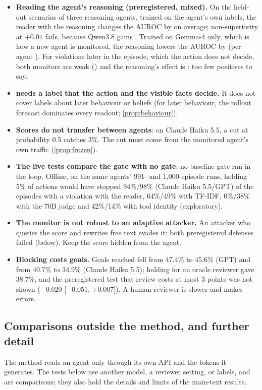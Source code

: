 \begin{itemize}
\item \textbf{Reading the agent's reasoning (preregistered, mixed).} On the held-out scenarios of three reasoning agents, trained on the agent's own labels, the reader with the reasoning changes the AUROC by \GEightInagent{} on average; non-superiority at $+0.01$ fails, because Qwen3.8 gains \GEightQwen{}. Trained on Gemma-4 only, which is how a new agent is monitored, the reasoning lowers the AUROC by \GEightTransfer{} (per agent \GEightTransferEach{}). For violations later in the episode, which the action does not decide, both monitors are weak (\GEightFutureLevel{}) and the reasoning's effect is \GEightFuture{}: too few positives to say.
\item \textbf{ needs a label that the action and the visible facts decide.} It does not cover labels about
  later behaviour or beliefs (for later behaviour, the rollout forecast dominates every readout; \cref{prop:behaviour}).
\item \textbf{Scores do not transfer between agents}: on Claude Haiku 5.5, a cut at probability 0.5 catches 3\%. The cut must come
  from the monitored agent's own traffic (\cref{prop:frozen}).
\item \textbf{The live tests compare the gate with no gate}; no baseline gate ran in the loop. Offline, on the same agents'
  991- and 1{,}000-episode runs, holding 5\% of actions would have stopped 94\%/98\% (Claude Haiku 5.5/GPT) of the episodes with a violation
  with the reader, 64\%/49\% with TF-IDF, 0\%/38\% with the 70B judge and 42\%/14\% with tool identity (exploratory).
\item \textbf{The monitor is not robust to an adaptive attacker.} An attacker who queries the score and rewrites free text evades it; both preregistered defenses failed (below). Keep the score hidden from the agent.
\item \textbf{Blocking costs goals.} Goals reached fell from 47.4\% to 45.6\% (GPT) and from 40.7\% to 34.9\% (Claude Haiku 5.5); holding
  for an oracle reviewer gave 38.7\%, and the preregistered test that review costs at most 3 points was not shown
  ($-0.020$ [$-0.051$, $+0.007$]). A human reviewer is slower and makes errors.
\end{itemize}

\subsection{Comparisons outside the method, and further detail}\label{app:comparisons}
The method reads an agent only through its own API and the tokens it generates. The tests below use another model, a reviewer setting, or labels, and are comparisons; they also hold the details and limits of the main-text results.

